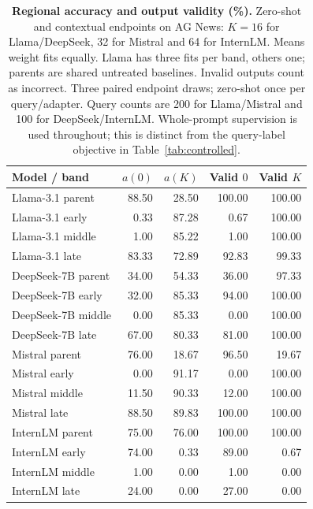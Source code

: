 \begin{table}[htbp]\centering\color{blue}\footnotesize
\caption{\textbf{Regional accuracy and output validity (\%).} Zero-shot and contextual endpoints on AG News: $K=16$ for Llama/DeepSeek, 32 for Mistral and 64 for InternLM. Means weight fits equally. Llama has three fits per band, others one; parents are shared untreated baselines. Invalid outputs count as incorrect. Three paired endpoint draws; zero-shot once per query/adapter. Query counts are 200 for Llama/Mistral and 100 for DeepSeek/InternLM. Whole-prompt supervision is used throughout; this is distinct from the query-label objective in Table~\ref{tab:controlled}.}
\label{tab:recovery}
\begin{tabular}{lrrrr}
\toprule
Model / band & $a(0)$ & $a(K)$ & Valid $0$ & Valid $K$ \\
\midrule
Llama-3.1 parent & 88.50 & 28.50 & 100.00 & 100.00 \\
Llama-3.1 early & 0.33 & 87.28 & 0.67 & 100.00 \\
Llama-3.1 middle & 1.00 & 85.22 & 1.00 & 100.00 \\
Llama-3.1 late & 83.33 & 72.89 & 92.83 & 99.33 \\
DeepSeek-7B parent & 34.00 & 54.33 & 36.00 & 97.33 \\
DeepSeek-7B early & 32.00 & 85.33 & 94.00 & 100.00 \\
DeepSeek-7B middle & 0.00 & 85.33 & 0.00 & 100.00 \\
DeepSeek-7B late & 67.00 & 80.33 & 81.00 & 100.00 \\
Mistral parent & 76.00 & 18.67 & 96.50 & 19.67 \\
Mistral early & 0.00 & 91.17 & 0.00 & 100.00 \\
Mistral middle & 11.50 & 90.33 & 12.00 & 100.00 \\
Mistral late & 88.50 & 89.83 & 100.00 & 100.00 \\
InternLM parent & 75.00 & 76.00 & 100.00 & 100.00 \\
InternLM early & 74.00 & 0.33 & 89.00 & 0.67 \\
InternLM middle & 1.00 & 0.00 & 1.00 & 0.00 \\
InternLM late & 24.00 & 0.00 & 27.00 & 0.00 \\
\bottomrule\end{tabular}\end{table}
